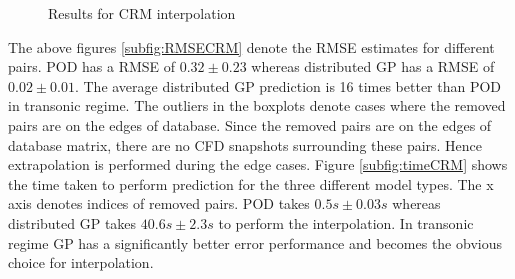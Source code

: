 \begin{figure}[!ht]
  \centering
  \quad
  \caption{Results for CRM interpolation}
\end{figure}

The above figures \ref{subfig:RMSECRM} denote the RMSE estimates for different pairs. POD has a RMSE of \(0.32\pm0.23\) whereas distributed GP has a RMSE of \(0.02\pm0.01\). The average distributed GP prediction is 16 times better than POD in transonic regime. The outliers in the boxplots denote cases where the removed pairs are on the edges of database. Since the removed pairs are on the edges of database matrix, there are no CFD snapshots surrounding these pairs. Hence extrapolation is performed during the edge cases. Figure \ref{subfig:timeCRM} shows the time taken to perform prediction for the three different model types. The x axis denotes indices of removed pairs. POD takes \(0.5s\pm0.03s\) whereas distributed GP takes \(40.6s\pm2.3s\) to perform the interpolation. In transonic regime GP has a significantly better error performance and becomes the obvious choice for interpolation.

